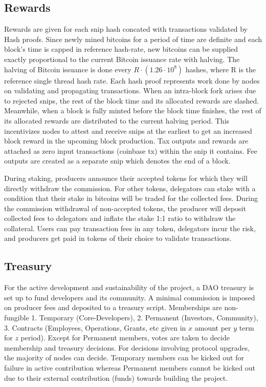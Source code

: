 \documentclass[a4paper, 10pt]{extarticle}
\begin{document}
\subsection{Rewards}
Rewards are given for each snip hash concated with transactions validated by Hash proofs. Since newly mined bitcoins for a period of time are definite and each block's time is capped in reference hash-rate, new bitcoins can be supplied exactly proportional to the current Bitcoin issuance rate with halving. The halving of Bitcoin issuance is done every $R \cdot (1.26 \cdot 10^8)$ hashes, where R is the reference single thread hash rate. Each hash proof represents work done by nodes on validating and propagating transactions. When an intra-block fork arises due to rejected snips, the rest of the block time and its allocated rewards are slashed. Meanwhile, when a block is fully minted before the block time finishes, the rest of its allocated rewards are distributed to the current halving period. This incentivizes nodes to attest and receive snips at the earliest to get an increased block reward in the upcoming block production. Tax outputs and rewards are attached as zero input transactions (coinbase tx) within the snip it contains. Fee outputs are created as a separate snip which denotes the end of a block.

During staking, producers announce their accepted tokens for which they will directly withdraw the commission. For other tokens, delegators can stake with a condition that their stake in bitcoins will be traded for the collected fees. During the commission withdrawal of non-accepted tokens, the producer will deposit collected fees to delegators and inflate the stake 1:1 ratio to withdraw the collateral. Users can pay transaction fees in any token, delegators incur the risk, and producers get paid in tokens of their choice to validate transactions.
\subsection{Treasury}
For the active development and sustainability of the project, a DAO treasury is set up to fund developers and its community. A minimal commission is imposed on producer fees and deposited to a treasury script. Memberships are non-fungible 1. Temporary (Core-Developers), 2. Permanent (Investors, Community), 3. Contracts (Employees, Operations, Grants, etc given in $x$ amount per $y$ term for $z$ period). Except for Permanent members, votes are taken to decide membership and treasury decisions. For decisions involving protocol upgrades, the majority of nodes can decide. Temporary members can be kicked out for failure in active contribution whereas Permanent members cannot be kicked out due to their external contribution (funds) towards building the project.
\end{document}
